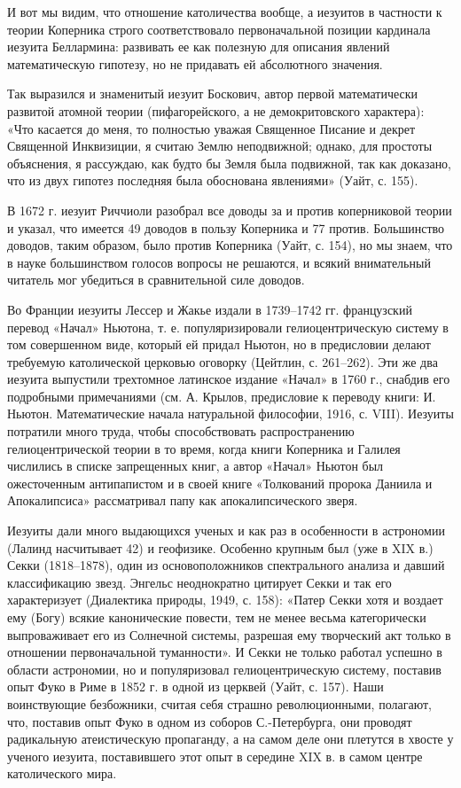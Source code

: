И вот мы видим, что отношение католичества вообще, а иезуитов в частности к
теории Коперника строго соответствовало первоначальной позиции кардинала
иезуита Беллармина: развивать ее как полезную для описания явлений
математическую гипотезу, но не придавать ей абсолютного значения.

Так выразился и знаменитый иезуит Боскович, автор первой математически развитой
атомной теории (пифагорейского, а не демокритовского характера): «Что касается
до меня, то полностью уважая Священное Писание и декрет Священной Инквизиции, я
считаю Землю неподвижной; однако, для простоты объяснения, я рассуждаю, как
будто бы Земля была подвижной, так как доказано, что из двух гипотез последняя
была обоснована явлениями» (Уайт, с. 155).

В 1672 г. иезуит Риччиоли разобрал все доводы за и против коперниковой теории и
указал, что имеется 49 доводов в пользу Коперника и 77 против. Большинство
доводов, таким образом, было против Коперника (Уайт, с. 154), но мы знаем, что
в науке большинством голосов вопросы не решаются, и всякий внимательный
читатель мог убедиться в сравнительной силе доводов.

Во Франции иезуиты Лессер и Жакье издали в 1739--1742 гг. французский перевод
«Начал» Ньютона, т. е. популяризировали гелиоцентрическую систему в том
совершенном виде, который ей придал Ньютон, но в предисловии делают требуемую
католической церковью оговорку (Цейтлин, с. 261--262). Эти же два иезуита
выпустили трехтомное латинское издание «Начал» в 1760 г., снабдив его
подробными примечаниями (см. А. Крылов, предисловие к переводу книги: И.
Ньютон. Математические начала натуральной философии, 1916, с. VIII). Иезуиты
потратили много труда, чтобы способствовать распространению гелиоцентрической
теории в то время, когда книги Коперника и Галилея числились в списке
запрещенных книг, а автор «Начал» Ньютон был ожесточенным антипапистом и в
своей книге «Толкований пророка Даниила и Апокалипсиса» рассматривал папу как
апокалипсического зверя.

Иезуиты дали много выдающихся ученых и как раз в особенности в астрономии
(Лалинд насчитывает 42) и геофизике. Особенно крупным был (уже в XIX в.) Секки
(1818--1878), один из основоположников спектрального анализа и давший
классификацию звезд. Энгельс неоднократно цитирует Секки и так его
характеризует (Диалектика природы, 1949, с. 158): «Патер Секки хотя и воздает
ему (Богу) всякие канонические повести, тем не менее весьма категорически
выпроваживает его из Солнечной системы, разрешая ему творческий акт только в
отношении первоначальной туманности». И Секки не только работал успешно в
области астрономии, но и популяризовал гелиоцентрическую систему, поставив опыт
Фуко в Риме в 1852 г. в одной из церквей (Уайт, с. 157). Наши воинствующие
безбожники, считая себя страшно революционными, полагают, что, поставив опыт
Фуко в одном из соборов С.-Петербурга, они проводят радикальную атеистическую
пропаганду, а на самом деле они плетутся в хвосте у ученого иезуита,
поставившего этот опыт в середине XIX в. в самом центре католического мира.

